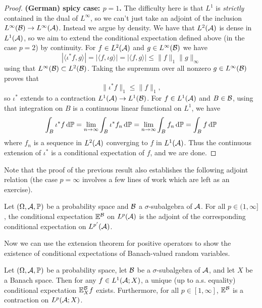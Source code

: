 \begin{proof}
  \textbf{(German) spicy case: $p = 1$.} The difficulty here is that $L^1$ is \emph{strictly} contained in the dual of $L^\infty$, so we can't just take an adjoint of the inclusion $L^\infty(\mathcal{B}) \to L^\infty(\mathcal{A})$.
  Instead we argue by density.
  We have that $L^2(\mathcal{A})$ is dense in $L^1(\mathcal{A})$, so we aim to extend the conditional expectation defined above (in the case $p=2$) by continuity.
  For $f \in L^2(\mathcal{A})$ and $g \in L^\infty(\mathcal{B})$ we have
  \begin{equation*}
    |\langle \iota^* f, g \rangle| = |\langle f, \iota g \rangle| = |\langle f, g \rangle| \leq \|f\|_1 \|g\|_\infty
  \end{equation*}
  using that $L^\infty(\mathcal{B}) \subset L^2(\mathcal{B})$.
  Taking the supremum over all nonzero $g \in L^\infty(\mathcal{B})$ proves that
  \begin{equation*}
    \|\iota^* f\|_1 \leq \|f\|_1,
  \end{equation*}
  so $\iota^*$ extends to a contraction $L^1(\mathcal{A}) \to L^1(\mathcal{B})$.
  For $f \in L^1(\mathcal{A})$ and $B \in \mathcal{B}$, using that integration on $B$ is a continuous linear functional on $L^1$, we have
  \begin{equation*}
    \int_B \iota^* f \, \mathrm{d}\mathbb{P}
    = \lim_{n \to \infty} \int_B \iota^* f_n \, \mathrm{d}\mathbb{P}
    = \lim_{n \to \infty} \int_B  f_n \, \mathrm{d}\mathbb{P}
    = \int_B f \, \mathrm{d}\mathbb{P}
  \end{equation*}
  where $f_n$ is a sequence in $L^2(\mathcal{A})$ converging to $f$ in $L^1(\mathcal{A})$.
  Thus the continuous extension of $\iota^*$ is a conditional expectation of $f$, and we are done.
\end{proof}

Note that the proof of the previous result also establishes the following adjoint relation (the case $p=\infty$ involves a few lines of work which are left as an exercise).

\begin{prop}
  Let $(\Omega,\mathcal{A},\mathbb{P})$ be a probability space and $\mathcal{B}$ a $\sigma$-subalgebra of $\mathcal{A}$.
  For all $p \in (1,\infty]$, the conditional expectation $\mathbb{E}^{\mathcal{B}}$ on $L^p(\mathcal{A})$ is the adjoint of the corresponding conditional expectation on $L^{p'}(\mathcal{A})$. 
\end{prop}

Now we can use the extension theorem for positive operators to show the existence of conditional expectations of Banach-valued random variables.

\begin{prop}
  Let $(\Omega,\mathcal{A},\mathbb{P})$ be a probability space, let $\mathcal{B}$ be a $\sigma$-subalgebra of $\mathcal{A}$, and let $X$ be a Banach space.
  Then for any $f \in L^1(\mathcal{A};X)$, a unique (up to a.s. equality) conditional expectation $\mathbb{E}_X^{\mathcal{B}}f$ exists.
  Furthermore, for all $p \in [1,\infty]$, $\mathbb{E}^{\mathcal{B}}$ is a contraction on $L^p(\mathcal{A};X)$.
\end{prop}

